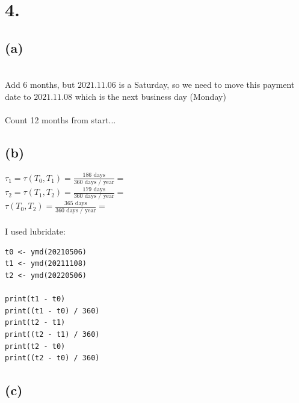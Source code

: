 \documentclass{article}
\begin{document}
\section*{4.}
{\Large 

\subsection*{(a)}

 \\ 
Add 6 months, but $2021.11.06$ is a Saturday, so we need to move this payment date to $2021.11.08$ which is the next business day (Monday) \\  
 \\
Count 12 months from start... \\

\subsection*{(b)}

$\tau_1 = \tau(T_0, T_1) = \frac{186 \text{ days}}{360 \text{ days / year}} = $  \\
$\tau_2 = \tau(T_1, T_2) = \frac{179 \text{ days}}{360 \text{ days / year}} = $  \\
$\tau(T_0, T_2) = \frac{365 \text{ days}}{360 \text{ days / year}} = $  \\ \\
I used lubridate:
\begin{verbatim}
t0 <- ymd(20210506)
t1 <- ymd(20211108)
t2 <- ymd(20220506)

print(t1 - t0)
print((t1 - t0) / 360)
print(t2 - t1)
print((t2 - t1) / 360)
print(t2 - t0)
print((t2 - t0) / 360)
\end{verbatim}

\subsection*{(c)}

}
\end{document}
